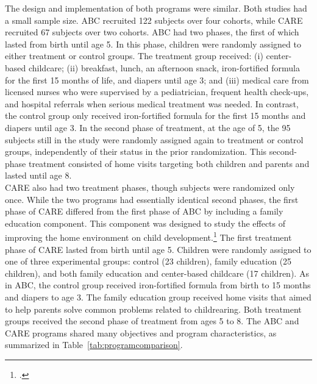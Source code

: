 \noindent The design and implementation of both programs were similar. Both studies had a small sample size. ABC recruited 122 subjects over four cohorts, while CARE recruited 67 subjects over two cohorts. ABC had two phases, the first of which lasted from birth until age 5. In this phase, children were randomly assigned to either treatment or control groups. The treatment group received: (i) center-based childcare; (ii) breakfast, lunch, an afternoon snack, iron-fortified formula for the first 15 months of life, and diapers until age 3; and (iii) medical care from licensed nurses who were supervised by a pediatrician, frequent health check-ups, and hospital referrals when serious medical treatment was needed. In contrast, the control group only received iron-fortified formula for the first 15 months and diapers until age 3. In the second phase of treatment, at the age of 5, the 95 subjects still in the study were randomly assigned again to treatment or control groups, independently of their status in the prior randomization. This second-phase treatment consisted of home visits targeting both children and parents and lasted until age 8.\\ 

\noindent  CARE also had two treatment phases, though subjects were randomized only once. While the two programs had essentially identical second phases, the first phase of CARE differed from the first phase of ABC by including a family education component. This component was designed to study the effects of improving the home environment on child development.\footnote{\citet{Wasik_Ramey_etal_1990_CD}.} The first treatment phase of CARE lasted from birth until age 5. Children were randomly assigned to one of three experimental groups: control (23 children), family education (25 children), and both family education and center-based childcare (17 children). As in ABC, the control group received iron-fortified formula from birth to 15 months and diapers to age 3. The family education group received home visits that aimed to help parents solve common problems related to childrearing. Both treatment groups received the second phase of treatment from ages 5 to 8. The ABC and CARE programs shared many objectives and program characteristics, as summarized in Table~\ref{tab:programcomparison}.



